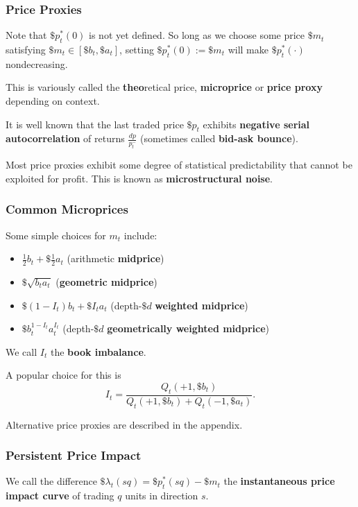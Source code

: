 \documentclass{article}
\begin{document}
\subsubsection{Price Proxies}
Note that $\$p^*_t(0)$ is not yet defined. So long as we choose some price $\$m_t$ satisfying $\$m_t\in[\$b_t,\$a_t]$, setting $\$p^*_t(0) := \$m_t$ will make $\$p^*_t(\cdot)$ nondecreasing.

This is variously called the \textbf{theo}retical price, \textbf{microprice} or \textbf{price proxy} depending on context.

It is well known that the last traded price $\$p_t$ exhibits \textbf{negative serial autocorrelation} of returns $\frac{dp}{p_t^-}$ (sometimes called \textbf{bid-ask bounce}).

Most price proxies exhibit some degree of statistical predictability that cannot be exploited for profit. This is known as \textbf{microstructural noise}.


\subsubsection{Common Microprices}
Some simple choices for $m_t$ include:
\begin{itemize}
	\item $\frac{1}{2}b_t+\$\frac{1}{2}a_t$ (arithmetic \textbf{midprice})
	\item $\$\sqrt{b_ta_t}$ (\textbf{geometric midprice})
	\item $\$(1-I_t)b_t + \$I_ta_t$ (depth-$\$d$ \textbf{weighted midprice})
	\item $\$b_t^{1-I_t}a_t^{I_t}$ (depth-$\$d$ \textbf{geometrically weighted midprice})
\end{itemize}
We call $I_t$ the \textbf{book imbalance}.

A popular choice for this is
$$I_t=\frac{Q_t(+1,\$b_t)}{Q_t(+1,\$b_t)+Q_t(-1,\$a_t)}.$$

Alternative price proxies are described in the appendix.

\subsubsection{Persistent Price Impact}
We call the difference $\$\lambda_t(sq) = \$p^*_t(sq) - \$m_t$ the \textbf{instantaneous price impact curve} of trading $q$ units in direction $s$.%
\end{document}
